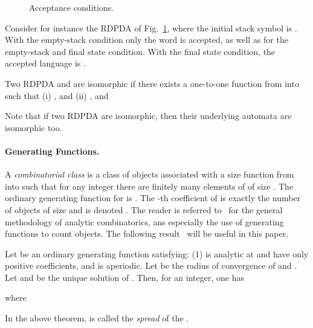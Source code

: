 \begin{figure}[h!]
\begin{center}
\end{center}
\caption{Acceptance conditions.}\label{fig:acceptation}
\end{figure}
Consider for instance the RDPDA of Fig.~\ref{fig:acceptation}, where the
initial stack symbol is . With the empty-stack condition only the word
 is accepted, as well as for the empty-stack and final state condition.
With the final state condition, the accepted language is .

Two RDPDA 
and  are isomorphic if
there exists a one-to-one function  from  into  such that
(i) , and (ii) , and
 
Note that if two RDPDA are isomorphic, then their underlying automata are
isomorphic too.



\paragraph{Generating Functions.}
A {\it combinatorial class} is a class  of objects associated
with a size function  from  into  such that
for any integer  there are finitely many elements of  of
size . The ordinary generating function for  is
. The -th coefficient of  is
exactly the number of objects of size  and is denoted . The
reader is referred to~\cite{FSbook} for the general methodology of analytic
combinatorics, ans especially the use of generating functions to count
objects. The following result~\cite[Theorem~VIII.8]{FSbook} will be useful
in this paper.

\begin{theorem}\label{thm:VIII.8}
Let  be an ordinary generating function satisfying: (1)  is
analytic at  and have only positive coefficients,   and
  is aperiodic. Let  be the radius of convergence of 
and .
Let  and  be the  unique
solution of . Then, for  an
integer, one has

where 
\end{theorem}
In the above theorem,  is called the \textit{spread} of the . 

